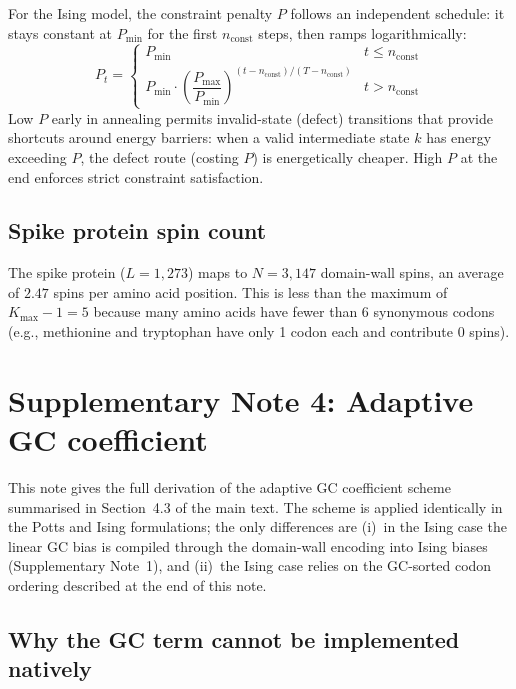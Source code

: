 \documentclass[11pt]{article}
\begin{document}
For the Ising model, the constraint penalty $P$ follows an independent schedule: it stays constant at $P_{\mathrm{min}}$ for the first $n_{\mathrm{const}}$ steps, then ramps logarithmically:
\begin{equation}\label{eq:P-schedule}
  P_t = \begin{cases}
    P_{\mathrm{min}} & t \leq n_{\mathrm{const}} \\[4pt]
    P_{\mathrm{min}} \cdot \left( \dfrac{P_{\mathrm{max}}}{P_{\mathrm{min}}} \right)^{(t - n_{\mathrm{const}})/(T - n_{\mathrm{const}})} & t > n_{\mathrm{const}}
  \end{cases}
\end{equation}
Low $P$ early in annealing permits invalid-state (defect) transitions that provide shortcuts around energy barriers: when a valid intermediate state $k$ has energy exceeding $P$, the defect route (costing $P$) is energetically cheaper.
High $P$ at the end enforces strict constraint satisfaction.

\subsection*{Spike protein spin count}

The spike protein ($L = 1{,}273$) maps to $N = 3{,}147$ domain-wall spins, an average of $2.47$ spins per amino acid position.
This is less than the maximum of $K_{\mathrm{max}} - 1 = 5$ because many amino acids have fewer than 6 synonymous codons (e.g., methionine and tryptophan have only 1 codon each and contribute 0 spins).

\section*{Supplementary Note 4: Adaptive GC coefficient}\label{sec:supp_gc}

This note gives the full derivation of the adaptive GC coefficient scheme summarised in Section~4.3 of the main text.
The scheme is applied identically in the Potts and Ising formulations; the only differences are (i)~in the Ising case the linear GC bias is compiled through the domain-wall encoding into Ising biases (Supplementary Note~1), and (ii)~the Ising case relies on the GC-sorted codon ordering described at the end of this note.

\subsection*{Why the GC term cannot be implemented natively}
\end{document}
